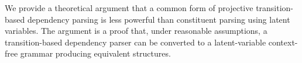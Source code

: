 We provide a theoretical argument that a common form of projective transition-based dependency parsing is less powerful than constituent parsing using latent variables.  The argument is a proof that, under reasonable assumptions, a transition-based dependency parser can be converted to a latent-variable context-free grammar producing equivalent structures.
